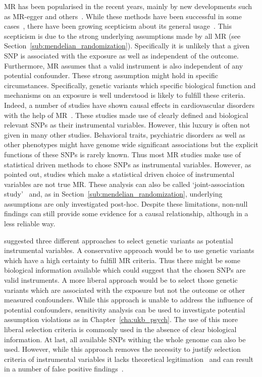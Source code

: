 MR has been popularised in the recent years, mainly by new developments such as MR-egger and others~\cite{Bowden2015}.
While these methods have been successful in some cases~\cite{Swerdlow}, there have been growing scepticism about its general usage~\cite{Thomas2010,Hemani2016,Brion2014,Voight2014,Burgess2016,Burgess2016a}. 
This scepticism is due to the strong underlying assumptions made by all MR (see Section~\ref{sub:mendelian_randomization}).
Specifically it is unlikely that a given SNP is associated with the exposure as well as independent of the outcome.
Furthermore, MR assumes that a valid instrument is also independent of any potential confounder.
These strong assumption might hold in specific circumstances.
Specifically, genetic variants which specific biological function and mechanisms on an exposure is well understood is likely to fulfill these criteria.
Indeed, a number of studies have shown causal effects in cardiovascular disorders with the help of MR~\cite{Swerdlow,Ference2015,Lieb2013,Voight2012a}.
These studies made use of clearly defined and biological relevant SNPs as their instrumental variables.
However, this luxury is often not given in many other studies.
Behavioral traits, psychiatric disorders as well as other phenotypes might have genome wide significant associations but the explicit functions of these SNPs is rarely known.
Thus most MR studies make use of statistical driven methods to chose SNPs as instrumental variables.
However, as~\citet{Burgess2016a} pointed out, studies which make a statistical driven choice of instrumental variables are not true MR\@.
These analysis can also be called `joint-association study'~\citet{Burgess2016a} and, as in Section~\ref{sub:mendelian_randomization}, underlying assumptions are only investigated post-hoc.
Despite these limitations, non-null findings can still provide some evidence for a causal relationship, although in a less reliable way.

\citet{Burgess2016a} suggested three different approaches to select genetic variants as potential instrumental  variables.
A conservative approach would be to use genetic variants which have a high certainty to fulfill MR criteria.
Thus there might be some biological information available which could suggest that the chosen SNPs are valid instruments.
A more liberal approach would be to select those genetic variants which are associated with the exposure but not the outcome or other measured confounders.
While this approach is unable to address the influence of potential confounders, sensitivity analysis can be used to investigate potential assumption violations as in Chapter~\ref{cha:ukb_psych}.
The use of this more liberal selection criteria is commonly used in the absence of clear biological information.
At last, all available SNPs withing the whole genome can also be used.
However, while this approach removes the necessity to justify  selection criteria of instrumental variables it lacks theoretical legitimation~\cite{Burgess2016a} and can result in a number of false positive findings~\cite{Evans2013}.

